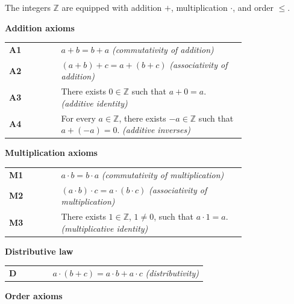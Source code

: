 \begin{tcolorbox}[colback=axiombox, colframe=axiomborder, arc=2pt,
  left=6pt, right=6pt, top=4pt, bottom=4pt,
  title={\small\textbf{Axioms for $\mathbb{Z}$ as an Ordered Commutative Ring}},
  fonttitle=\small\bfseries]

The integers $\mathbb{Z}$ are equipped with addition $+$,
multiplication $\cdot$, and order $\leq$.

\medskip
\noindent\textbf{Addition axioms}

\medskip
\begin{tabular}{@{} l p{0.78\linewidth} @{}}
\textbf{A1} & $a + b = b + a$
             \hfill\textit{(commutativity of addition)} \\[4pt]
\textbf{A2} & $(a + b) + c = a + (b + c)$
             \hfill\textit{(associativity of addition)} \\[4pt]
\textbf{A3} & There exists $0 \in \mathbb{Z}$ such that $a + 0 = a$.
             \hfill\textit{(additive identity)} \\[4pt]
\textbf{A4} & For every $a \in \mathbb{Z}$, there exists $-a \in \mathbb{Z}$
             such that $a + (-a) = 0$.
             \hfill\textit{(additive inverses)} \\[4pt]
\end{tabular}

\medskip
\noindent\textbf{Multiplication axioms}

\medskip
\begin{tabular}{@{} l p{0.78\linewidth} @{}}
\textbf{M1} & $a \cdot b = b \cdot a$
             \hfill\textit{(commutativity of multiplication)} \\[4pt]
\textbf{M2} & $(a \cdot b) \cdot c = a \cdot (b \cdot c)$
             \hfill\textit{(associativity of multiplication)} \\[4pt]
\textbf{M3} & There exists $1 \in \mathbb{Z}$, $1 \neq 0$, such that
             $a \cdot 1 = a$.
             \hfill\textit{(multiplicative identity)} \\[4pt]
\end{tabular}

\medskip
\noindent\textbf{Distributive law}

\medskip
\begin{tabular}{@{} l p{0.78\linewidth} @{}}
\textbf{D} & $a \cdot (b + c) = a \cdot b + a \cdot c$
            \hfill\textit{(distributivity)} \\[4pt]
\end{tabular}

\medskip
\noindent\textbf{Order axioms}


\end{tcolorbox}
